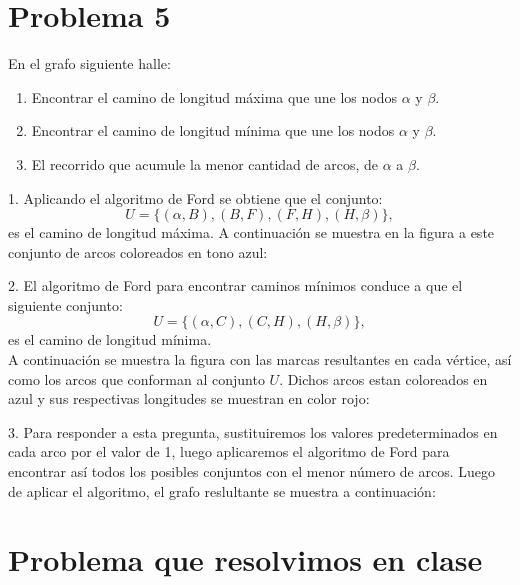 \documentclass[autocontact]{gaceta}
\begin{document}
\section{Problema 5}
En el grafo siguiente halle:
    \begin{enumerate}
        \item Encontrar el camino de longitud máxima que une los nodos $\alpha$ y $\beta$.
        \item Encontrar el camino de longitud mínima que une los nodos $\alpha$ y $\beta$.
        \item El recorrido que acumule la menor cantidad de arcos, de $\alpha$ a $\beta$.
    \end{enumerate}

    
    

    1. Aplicando el algoritmo de Ford se obtiene que el conjunto:
    $$ U = \{ (\alpha, B), (B, F), (F, H), (H, \beta) \}, $$
    es el camino de longitud máxima. A continuación se muestra en la figura a este conjunto de arcos 
    coloreados en tono azul:

    


    2. El algoritmo de Ford para encontrar caminos mínimos conduce a que el siguiente conjunto:
    $$ U = \{ (\alpha, C), (C, H), (H, \beta) \}, $$
    es el camino de longitud mínima.\\ A continuación se muestra la figura con las marcas resultantes 
    en cada vértice, así como los arcos que conforman 
    al conjunto $U$. Dichos arcos estan coloreados en azul y sus respectivas longitudes se muestran en color
    rojo:

    

    3. Para responder a esta pregunta, sustituiremos los valores predeterminados en cada 
    arco por el valor de 1, luego aplicaremos el algoritmo de Ford para encontrar así 
    todos los posibles conjuntos con el menor número de arcos.
    Luego de aplicar el algoritmo, el grafo reslultante se muestra a continuación:


    


\section{Problema que resolvimos en clase}
   



\end{document}
